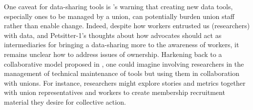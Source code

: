 {One caveat for data-sharing tools is \citet{khovanskaya2020bottom}'s warning that creating new data tools, especially ones to be managed by a union, can potentially burden union staff rather than enable change. Indeed, despite how workers entrusted us (researchers) with data, and Petsitter-1's thoughts about how advocates should act as intermediaries for bringing a data-sharing more to the awareness of workers, it remains unclear how to address issues of ownership. 
Harkening back to a collaborative model proposed in \cite{supporting}, one could imagine involving researchers in the management of technical maintenance of tools but using them in collaboration with unions. For instance, researchers might explore stories and metrics together with union representatives and workers to create membership recruitment material they desire for collective action.
}





